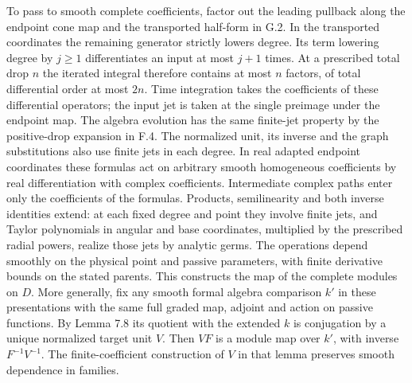 \documentclass[
  english,
  11pt,
  reqno]{amsart}
\begin{document}
To pass to smooth complete coefficients, factor out the leading pullback
along the endpoint cone map and the transported half-form in G.2. In the
transported coordinates the remaining generator strictly lowers degree.
Its term lowering degree by \(j\ge1\) differentiates an input at most
\(j+1\) times. At a prescribed total drop \(n\) the iterated integral
therefore contains at most \(n\) factors, of total differential order at
most \(2n\). Time integration takes the coefficients of these
differential operators; the input jet is taken at the single preimage
under the endpoint map. The algebra evolution has the same finite-jet
property by the positive-drop expansion in F.4. The normalized unit, its
inverse and the graph substitutions also use finite jets in each degree.
In real adapted endpoint coordinates these formulas act on arbitrary
smooth homogeneous coefficients by real differentiation with complex
coefficients. Intermediate complex paths enter only the coefficients of
the formulas. Products, semilinearity and both inverse identities
extend: at each fixed degree and point they involve finite jets, and
Taylor polynomials in angular and base coordinates, multiplied by the
prescribed radial powers, realize those jets by analytic germs. The
operations depend smoothly on the physical point and passive parameters,
with finite derivative bounds on the stated parents. This constructs the
map of the complete modules on \(D\). More generally, fix any smooth
formal algebra comparison \(k'\) in these presentations with the same
full graded map, adjoint and action on passive functions. By Lemma 7.8
its quotient with the extended \(k\) is conjugation by a unique
normalized target unit \(V\). Then \(VF\) is a module map over \(k'\),
with inverse \(F^{-1}V^{-1}\). The finite-coefficient construction of
\(V\) in that lemma preserves smooth dependence in families.
\end{document}

